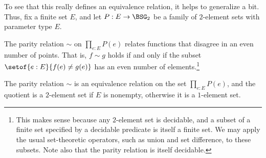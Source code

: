 To see that this really defines an equivalence relation, 
it helps to generalize a bit.
Thus, fix a finite set $E$, and let $P : E \to \BSG_2$ be a family 
of $2$-element sets with parameter type $E$.
\begin{definition}
  The parity relation $\sim$ on $\prod_{e:E}P(e)$ relates functions that disagree in an even number of points. That is, $f\sim g$ holds if and only if the
  subset $\setof{e:E}{f(e) \ne g(e)}$ has an even number of elements.\footnote{%
    This makes sense because any $2$-element set is decidable,
    and a subset of a finite set specified by a decidable predicate
    is itself a finite set. We may apply the usual set-theoretic
    operators, such as union and set difference, to these subsets.
    Note also that the parity relation is itself decidable.}
\end{definition}
\begin{lemma}\label{lem:parityequiv}
  The parity relation $\sim$ is an equivalence relation on the set $\prod_{e:E}P(e)$,
  and the quotient is a $2$-element set if $E$ is nonempty, otherwise it is
  a $1$-element set.
\end{lemma}
